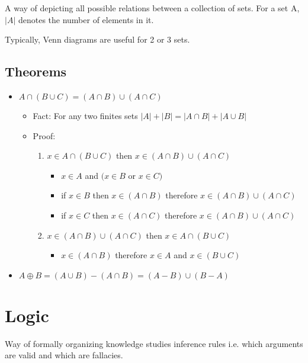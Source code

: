 \documentclass[9pt, letterpaper, oneside]{article}
\begin{document}
A way of depicting all possible relations between a collection of sets. For a set A, $|A|$ denotes the number of elements in it. 

Typically, Venn diagrams are useful for 2 or 3 sets.

\subsection{Theorems}

\begin{itemize}
	\item $A \cap (B \cup C) = (A \cap B) \cup (A \cap C)$
	\begin{itemize}
		\item Fact: For any two finites sets $|A| + |B| = |A \cap B| + |A \cup B|$
		\item Proof:
		\begin{enumerate}
			\item $x \in A \cap (B \cup C)$ then $x \in (A \cap B) \cup (A \cap C)$
			\begin{itemize}
				\item $x \in A$ and $(x \in B$ or $x \in C)$
				\item if $x \in B$ then $x \in (A \cap B)$ therefore $x \in (A \cap B) \cup (A \cap C)$
				\item if $x \in C$ then $x \in (A \cap C)$ therefore $x \in (A \cap B) \cup (A \cap C)$
			\end{itemize}
			\item $x \in (A \cap B) \cup (A \cap C)$ then $x \in A \cap (B \cup C)$
				\begin{itemize}
					\item $x \in (A \cap B)$ therefore $x \in A$ and $x \in (B \cup C)$
				\end{itemize}
		\end{enumerate}

	\end{itemize}
		\item $A \oplus B = (A \cup B)-(A \cap B) = (A - B) \cup (B - A)$
\end{itemize}



\section{Logic}

Way of formally organizing knowledge studies inference rules i.e. which arguments are valid and which are fallacies.
\end{document}
